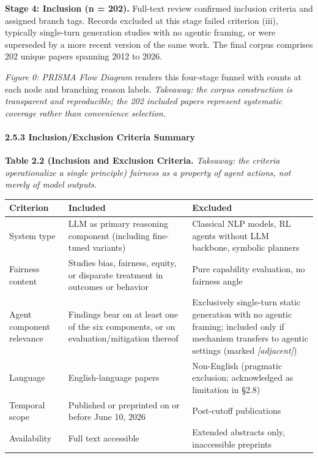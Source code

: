 \documentclass[10pt]{article}
\begin{document}
\textbf{Stage 4: Inclusion (n = 202).} Full-text review confirmed inclusion criteria and assigned branch tags. Records excluded at this stage failed criterion (iii), typically single-turn generation studies with no agentic framing, or were superseded by a more recent version of the same work. The final corpus comprises 202 unique papers spanning 2012 to 2026.

\emph{Figure 0: PRISMA Flow Diagram} renders this four-stage funnel with counts at each node and branching reason labels. \emph{Takeaway: the corpus construction is transparent and reproducible; the 202 included papers represent systematic coverage rather than convenience selection.}

\paragraph*{2.5.3 Inclusion/Exclusion Criteria Summary}

\textbf{Table 2.2 (Inclusion and Exclusion Criteria.} \emph{Takeaway: the criteria operationalize a single principle) fairness as a property of agent actions, not merely of model outputs.}

\begin{center}\footnotesize
\begin{longtable}{|p{}|p{}|p{}|}
\hline \textbf{Criterion} & \textbf{Included} & \textbf{Excluded} \\ \hline\endhead
System type & LLM as primary reasoning component (including fine-tuned variants) & Classical NLP models, RL agents without LLM backbone, symbolic planners \\ \hline
Fairness content & Studies bias, fairness, equity, or disparate treatment in outcomes or behavior & Pure capability evaluation, no fairness angle \\ \hline
Agent component relevance & Findings bear on at least one of the six components, or on evaluation/mitigation thereof & Exclusively single-turn static generation with no agentic framing; included only if mechanism transfers to agentic settings (marked \emph{[adjacent]}) \\ \hline
Language & English-language papers & Non-English (pragmatic exclusion; acknowledged as limitation in \S{}2.8) \\ \hline
Temporal scope & Published or preprinted on or before June 10, 2026 & Post-cutoff publications \\ \hline
Availability & Full text accessible & Extended abstracts only, inaccessible preprints \\ \hline
\end{longtable}\end{center}
\end{document}
